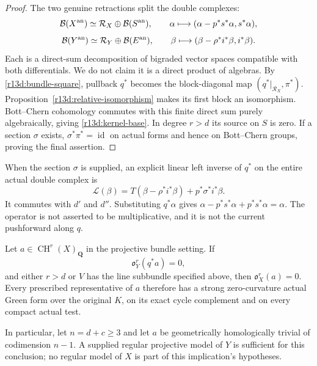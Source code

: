 \begin{proof}
The two genuine retractions split the double complexes:
\[
 \mathcal B(X^{\rm an})\simeq\mathcal R_X\oplus\mathcal B(S^{\rm an}),
 \qquad
 \alpha\longmapsto(\alpha-p^*s^*\alpha,s^*\alpha),
\]
\[
 \mathcal B(Y^{\rm an})\simeq\mathcal R_Y\oplus\mathcal B(E^{\rm an}),
 \qquad
 \beta\longmapsto(\beta-\rho^*i^*\beta,i^*\beta).
\]
Each is a direct-sum decomposition of bigraded vector spaces compatible
with both differentials.  We do not claim it is a direct product of
algebras.  By \eqref{r13d:bundle-square}, pullback $q^*$ becomes
the block-diagonal map $(q^*|_{\mathcal R_X},\pi^*)$.
Proposition~\ref{r13d:relative-isomorphism} makes its first block
an isomorphism.  Bott--Chern cohomology commutes with this finite
direct sum purely algebraically, giving
\eqref{r13d:kernel-base}.  In degree $r>d$ its source on $S$ is
zero.  If a section $\sigma$ exists, $\sigma^*\pi^*=\operatorname{id}$
on actual forms and hence on Bott--Chern groups, proving the final
assertion.
\end{proof}

When the section $\sigma$ is supplied, an explicit linear left inverse
of $q^*$ on the entire actual double complex is
\[
 \mathcal L(\beta)=
    T(\beta-\rho^*i^*\beta)+p^*\sigma^*i^*\beta.
\tag{R13.D11}\label{r13d:left-inverse}
\]
It commutes with $d'$ and $d''$.  Substituting $q^*\alpha$ gives
$\alpha-p^*s^*\alpha+p^*s^*\alpha=\alpha$.  The operator is not
asserted to be multiplicative, and it is not the current pushforward
along $q$.

\begin{corollary}
\label{r13d:strong-G}
Let $a\in\operatorname{CH}^r(X)_{\mathbf Q}$ in the projective bundle
setting.  If
\[
                         \mathfrak o_Y^r(q^*a)=0,
\]
and either $r>d$ or $V$ has the line subbundle specified above, then
$\mathfrak o_X^r(a)=0$.  Every prescribed representative of $a$
therefore has a strong zero-curvature actual Green form over the
original $K$, on its exact cycle complement and on every compact
actual test.

In particular, let $n=d+c\geq3$ and let $a$ be geometrically
homologically trivial of codimension $n-1$.  A supplied regular
projective model of $Y$ is sufficient for this conclusion; no regular
model of $X$ is part of this implication's hypotheses.
\end{corollary}

